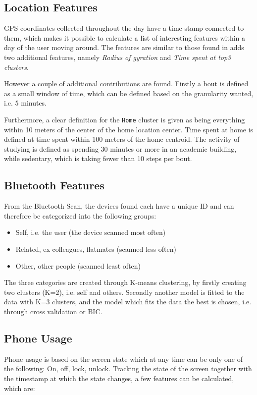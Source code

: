 \subsection{Location Features}
GPS coordinates collected throughout the day have a time stamp connected to them, which makes it possible to calculate a list of interesting features within a day of the user moving around. The features are similar to those found in \cite{Saeb2015} adds two additional features, namely \textit{Radius of gyration} and \textit{Time spent at top3 clusters}.

However a couple of additional contributions are found. Firstly a bout is defined as a small window of time, which can be defined based on the granularity wanted, i.e. 5 minutes. 

Furthermore, a clear definition for the \verb|Home| cluster is given as being everything within 10 meters of the center of the home location center. Time spent at home is defined at time spent within 100 meters of the home centroid. The activity of studying is defined as spending 30 minutes or more in an academic building, while sedentary, which is taking fewer than 10 steps per bout.

\subsection{Bluetooth Features}
From the Bluetooth Scan, the devices found each have a unique ID and can therefore be categorized into the following groups:

\begin{itemize}
    \item Self, i.e. the user (the device scanned most often)
    \item Related, ex colleagues, flatmates (scanned less often)
    \item Other, other people (scanned least often)
\end{itemize}

The three categories are created through K-means clustering, by firstly creating two clusters (K=2), i.e. self and others. Secondly another model is fitted to the data with K=3 clusters, and the model which fits the data the best is chosen, i.e. through cross validation or BIC.


\subsection{Phone Usage}
Phone usage is based on the screen state which at any time can be only one of the following: On, off, lock, unlock. Tracking the state of the screen together with the timestamp at which the state changes, a few features can be calculated, which are:

